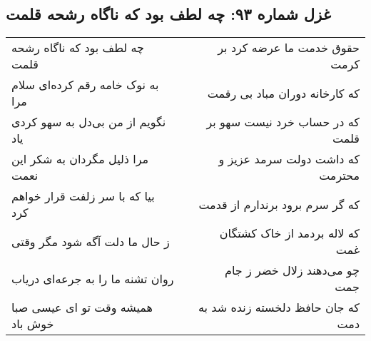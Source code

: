 \begin{center}
\section*{غزل شماره ۹۳: چه لطف بود که ناگاه رشحه قلمت}
\label{sec:sh093}
\begin{longtable}{l p{0.5cm} r}
چه لطف بود که ناگاه رشحه قلمت
&&
حقوق خدمت ما عرضه کرد بر کرمت
\\
به نوک خامه رقم کرده‌ای سلام مرا
&&
که کارخانه دوران مباد بی رقمت
\\
نگویم از من بی‌دل به سهو کردی یاد
&&
که در حساب خرد نیست سهو بر قلمت
\\
مرا ذلیل مگردان به شکر این نعمت
&&
که داشت دولت سرمد عزیز و محترمت
\\
بیا که با سر زلفت قرار خواهم کرد
&&
که گر سرم برود برندارم از قدمت
\\
ز حال ما دلت آگه شود مگر وقتی
&&
که لاله بردمد از خاک کشتگان غمت
\\
روان تشنه ما را به جرعه‌ای دریاب
&&
چو می‌دهند زلال خضر ز جام جمت
\\
همیشه وقت تو ای عیسی صبا خوش باد
&&
که جان حافظ دلخسته زنده شد به دمت
\\
\end{longtable}
\end{center}
